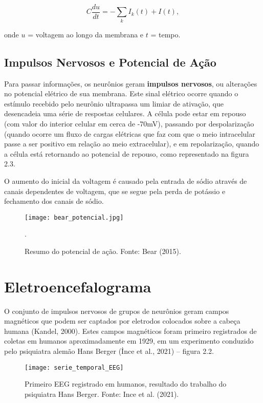 \begin{equation}
    C \frac{d u }{ d t} =  - \sum_{k} I_k (t) + I (t),
\end{equation}

onde $u$ = voltagem ao longo da membrana e $t$ = tempo. 








\subsection{Impulsos Nervosos e Potencial de Ação}
Para passar informações, os neurônios geram \textbf{impulsos nervosos}, ou alterações no potencial elétrico de sua membrana. Este sinal elétrico
ocorre quando o estímulo recebido pelo neurônio ultrapassa um limiar de ativação, que desencadeia uma série de respostas celulares. A célula pode 
estar em repouso (com valor do interior celular em cerca de -70mV), passando por despolarização (quando ocorre um fluxo de cargas elétricas que faz com 
que o meio intracelular passe a ser positivo em relação ao meio extracelular), e em repolarização, quando a célula está retornando ao potencial de repouso,
como representado na figura 2.3. 

O aumento do inicial da voltagem é causado pela entrada de sódio através de canais dependentes de voltagem, que se segue 
pela perda de potássio e fechamento dos canais de sódio. 


\begin{figure}[!h]
    \centering
    \texttt{[image: bear\_potencial.jpg]}
    \caption[Impulsos nervosos conduzidos em neurônios]{Resumo do potencial de ação. Fonte: Bear (2015).}.\label{fig:potencial}
    \end{figure}

\clearpage

\section{Eletroencefalograma}
O conjunto de impulsos nervosos de grupos de neurônios geram campos magnéticos
 que podem ser captados por eletrodos colocados sobre a cabeça humana (Kandel, 2000). 
 Estes campos magnéticos foram primeiro registrados de coletas em humanos aproximadamente em 1929,
  em um experimento conduzido pelo psiquiatra alemão Hans Berger (İnce et al., 2021) – figura 2.2. 
  \begin{figure}[h]
    \centering
    \texttt{[image: serie\_temporal\_EEG]}
    \caption[]{Primeiro EEG registrado em humanos, resultado do trabalho do psiquiatra Hans Berger. Fonte: Ince et al. (2021).} 
    \end{figure}



